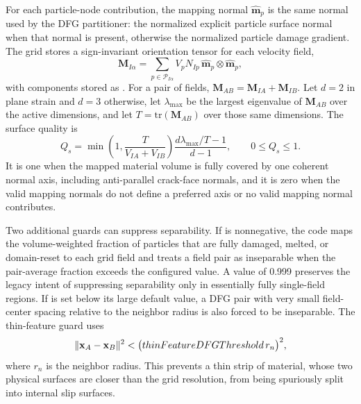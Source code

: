 For each particle-node contribution, the mapping normal $\hat{\mathbf{m}}_p$ is the same normal used by the DFG partitioner: the normalized explicit particle surface normal when that normal is present, otherwise the normalized particle damage gradient.  The grid stores a sign-invariant orientation tensor for each velocity field,
\begin{equation}
  \mathbf{M}_{I\alpha} = \sum_{p\in\mathcal{P}_{I\alpha}} V_p N_{Ip}\,
  \hat{\mathbf{m}}_p\otimes\hat{\mathbf{m}}_p,
  \label{eq:dfg-mapping-normal-tensor}
\end{equation}
with components stored as .  For a pair of fields, $\mathbf{M}_{AB}=\mathbf{M}_{IA}+\mathbf{M}_{IB}$.  Let $d=2$ in plane strain and $d=3$ otherwise, let $\lambda_{\max}$ be the largest eigenvalue of $\mathbf{M}_{AB}$ over the active dimensions, and let $T=\mathrm{tr}(\mathbf{M}_{AB})$ over those same dimensions.  The surface quality is
\begin{equation}
  Q_s =
  \min\!\left(1,\frac{T}{V_{IA}+V_{IB}}\right)
  \frac{d\lambda_{\max}/T-1}{d-1},
  \qquad 0\le Q_s\le 1.
  \label{eq:dfg-surface-quality}
\end{equation}
It is one when the mapped material volume is fully covered by one coherent normal axis, including anti-parallel crack-face normals, and it is zero when the valid mapping normals do not define a preferred axis or no valid mapping normal contributes.

Two additional guards can suppress separability.  If  is nonnegative, the code maps the volume-weighted fraction of particles that are fully damaged, melted, or domain-reset to each grid field and treats a field pair as inseparable when the pair-average fraction exceeds the configured value.  A value of 0.999 preserves the legacy intent of suppressing separability only in essentially fully single-field regions.  If  is set below its large default value, a DFG pair with very small field-center spacing relative to the neighbor radius is also forced to be inseparable.  The thin-feature guard uses
\begin{equation}
  \|\mathbf{x}_A-\mathbf{x}_B\|^2 <
  \big(thinFeatureDFGThreshold\,r_n\big)^2,
  \label{eq:dfg-thin-feature-guard}
\end{equation}
where $r_n$ is the neighbor radius.  This prevents a thin strip of material, whose two physical surfaces are closer than the grid resolution, from being spuriously split into internal slip surfaces.


